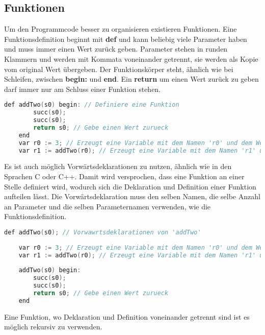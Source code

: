 \subsection{Funktionen}
Um den Programmcode besser zu organisieren existieren Funktionen. Eine Funktionsdefinition beginnt mit \textbf{def} und kann beliebig viele Parameter haben und muss immer einen Wert zurück geben. Parameter stehen in runden Klammern und werden mit Kommata voneinander getrennt, sie werden als Kopie vom original Wert übergeben. Der Funktionskörper steht, ähnlich wie bei Schleifen, zwischen \textbf{begin:} und \textbf{end}. Ein \textbf{return} um einen Wert zurück zu geben darf immer nur am Schluss einer Funktion stehen. 

\begin{lstlisting}[language=c, caption=Funktionen in While, label={lst:while-function}]
	def addTwo(s0) begin: // Definiere eine Funktion
		succ(s0);
		succ(s0);
		return s0; // Gebe einen Wert zurueck
	end
	var r0 := 3; // Erzeugt eine Variable mit dem Namen 'r0' und dem Wert 3
	var r1 := addTwo(r0); // Erzeugt eine Variable mit dem Namen 'r1' und dem Wert von addTwo(r0)
\end{lstlisting}

Es ist auch möglich Vorwärtsdeklarationen zu nutzen, ähnlich wie in den Sprachen C oder C++. Damit wird versprochen, dass eine Funktion an einer Stelle definiert wird, wodurch sich die Deklaration und Definition einer Funktion aufteilen lässt. Die Vorwärtsdeklaration muss den selben Namen, die selbe Anzahl an Parameter und die selben Parameternamen verwenden, wie die Funktionsdefinition.

\begin{lstlisting}[language=c, caption=Vorwärtsdekleration in While, label={lst:while-decfunction}]
	def addTwo(s0); // Vorwawrtsdeklarationen von 'addTwo'
	
	var r0 := 3; // Erzeugt eine Variable mit dem Namen 'r0' und dem Wert 3
	var r1 := addTwo(r0); // Erzeugt eine Variable mit dem Namen 'r1' und dem Wert von addTwo(r0)
	
	addTwo(s0) begin:
		succ(s0);
		succ(s0);
		return s0; // Gebe einen Wert zurueck
	end

\end{lstlisting}

Eine Funktion, wo Deklaration und Definition voneinander getrennt sind ist es möglich rekursiv zu verwenden.